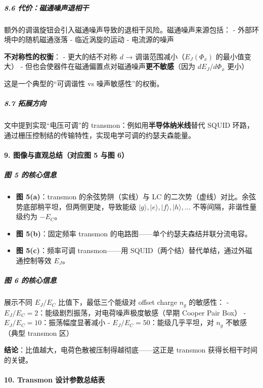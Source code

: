 \documentclass[12pt,a4paper,oneside]{ctexbook}
\providecommand{\tightlist}{%
  \setlength{\itemsep}{0pt}\setlength{\parskip}{0pt}}
\let\oldparagraph\paragraph
\renewcommand{\paragraph}[1]{\oldparagraph{#1}\mbox{}}
\let\oldsubparagraph\subparagraph
\renewcommand{\subparagraph}[1]{\oldsubparagraph{#1}\mbox{}}
\begin{document}
\subparagraph{8.6
代价：磁通噪声退相干}\label{ux4ee3ux4ef7ux78c1ux901aux566aux58f0ux9000ux76f8ux5e72}

额外的调谐旋钮会引入磁通噪声导致的退相干风险。磁通噪声来源包括： -
外部环境中的随机磁通涨落 - 临近涡旋的运动 - 电流源的噪声

\textbf{不对称性的权衡}： - 更大的结不对称 \(d\) →
调谐范围减小（\(E_J(\Phi_x)\) 的最小值变大） -
但也会使器件在磁通偏置点对磁通噪声\textbf{更不敏感}（因为
\(dE_J/d\Phi_x\) 更小）

这是一个典型的``可调谐性 vs 噪声敏感性''的权衡。

\subparagraph{8.7 拓展方向}\label{ux62d3ux5c55ux65b9ux5411}

文中提到实现``电压可调''的 transmon：例如用\textbf{半导体纳米线}替代
SQUID 环路，通过栅压控制结的传输特性，实现电学可调的约瑟夫森能量。


\paragraph{9. 图像与直观总结（对应图 5 与图
6）}\label{ux56feux50cfux4e0eux76f4ux89c2ux603bux7ed3ux5bf9ux5e94ux56fe-5-ux4e0eux56fe-6}

\subparagraph{图 5
的核心信息}\label{ux56fe-5-ux7684ux6838ux5fc3ux4fe1ux606f}

\begin{itemize}
\tightlist
\item
  \textbf{图 5(a)}：transmon 的余弦势阱（实线）与 LC
  的二次势（虚线）对比。余弦势底部稍平坦，但两侧更陡，导致能级
  \(|g\rangle,|e\rangle,|f\rangle,|h\rangle,\dots\)
  不等间隔，非谐性量级约为 \(-E_C\)。
\item
  \textbf{图 5(b)}：固定频率 transmon
  的电路图------单个约瑟夫森结并联分流电容。
\item
  \textbf{图 5(c)}：频率可调 transmon------用
  SQUID（两个结）替代单结，通过外磁通控制等效 \(E_J\)。
\end{itemize}

\subparagraph{图 6
的核心信息}\label{ux56fe-6-ux7684ux6838ux5fc3ux4fe1ux606f}

展示不同 \(E_J/E_C\) 比值下，最低三个能级对 offset charge \(n_g\)
的敏感性： - \(E_J/E_C = 2\)：能级剧烈振荡，对电荷噪声极度敏感（早期
Cooper Pair Box） - \(E_J/E_C = 10\)：振荡幅度显著减小 -
\(E_J/E_C = 50\)：能级几乎平坦，对 \(n_g\) 不敏感（典型 transmon 区）

\textbf{结论}：比值越大，电荷色散被压制得越彻底------这正是 transmon
获得长相干时间的关键。


\paragraph{10. Transmon
设计参数总结表}\label{transmon-ux8bbeux8ba1ux53c2ux6570ux603bux7ed3ux8868}
\end{document}
